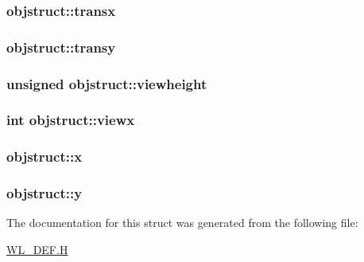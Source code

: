 \label{structobjstruct_a03288f28ee8b2fb29ac6982a54806c85}
\hypertarget{structobjstruct_acf9191c5d70833714cf92ef68f7e5ac2}{
\subsubsection[{transx}]{ {\bf objstruct::transx}}}
\label{structobjstruct_acf9191c5d70833714cf92ef68f7e5ac2}
\hypertarget{structobjstruct_a017e48f3fcc380a118517e79f57da3f3}{
\subsubsection[{transy}]{ {\bf objstruct::transy}}}
\label{structobjstruct_a017e48f3fcc380a118517e79f57da3f3}
\hypertarget{structobjstruct_af87ee31d4dd5e2c4704e2a7ebab98479}{
\subsubsection[{viewheight}]{\setlength{\rightskip}{0pt plus 5cm}unsigned {\bf objstruct::viewheight}}}
\label{structobjstruct_af87ee31d4dd5e2c4704e2a7ebab98479}
\hypertarget{structobjstruct_a716a71b04e2a6367839dc694149e1a94}{
\subsubsection[{viewx}]{\setlength{\rightskip}{0pt plus 5cm}int {\bf objstruct::viewx}}}
\label{structobjstruct_a716a71b04e2a6367839dc694149e1a94}
\hypertarget{structobjstruct_a5eabe013c04785b14459a64865762280}{
\subsubsection[{x}]{ {\bf objstruct::x}}}
\label{structobjstruct_a5eabe013c04785b14459a64865762280}
\hypertarget{structobjstruct_a312604fbf16bb95b961cc8f383295052}{
\subsubsection[{y}]{ {\bf objstruct::y}}}
\label{structobjstruct_a312604fbf16bb95b961cc8f383295052}


The documentation for this struct was generated from the following file:\begin{DoxyCompactItemize}
\item 
\hyperlink{WL__DEF_8H}{WL\_\-DEF.H}\end{DoxyCompactItemize}
